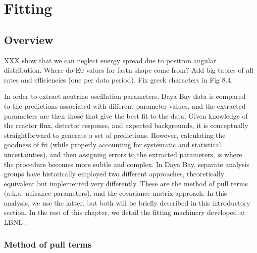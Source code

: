\documentclass[../thesis.tex]{subfiles}
\begin{document}
\chapter{Fitting}
\label{chap:fitting}

\section{Overview}
\label{sec:fitoverview}

XXX show that we can neglect energy spread due to positron angular distribution. Where do E0 values for fastn shape come from? Add big tables of all rates and efficiencies (one per data period). Fix greek characters in Fig 8.4.

In order to extract neutrino oscillation parameters, Daya Bay data is compared to the predictions associated with different parameter values, and the extracted parameters are then those that give the best fit to the data. Given knowledge of the reactor \nuebar flux, detector response, and expected backgrounds, it is conceptually straightforward to generate a set of predictions. However, calculating the goodness of fit (while properly accounting for systematic and statistical uncertainties), and then assigning errors to the extracted parameters, is where the procedure becomes more subtle and complex. In Daya Bay, separate analysis groups have historically employed two different approaches, theoretically equivalent but implemented very differently. These are the method of pull terms (a.k.a. nuisance parameters), and the covariance matrix approach. In this analysis, we use the latter, but both will be briefly described in this introductory section. In the rest of this chapter, we detail the fitting machinery developed at LBNL \cite{berkeley_shapefit,berkeley_toymc}.

\subsection{Method of pull terms}
\label{sec:pullterms}
\end{document}
